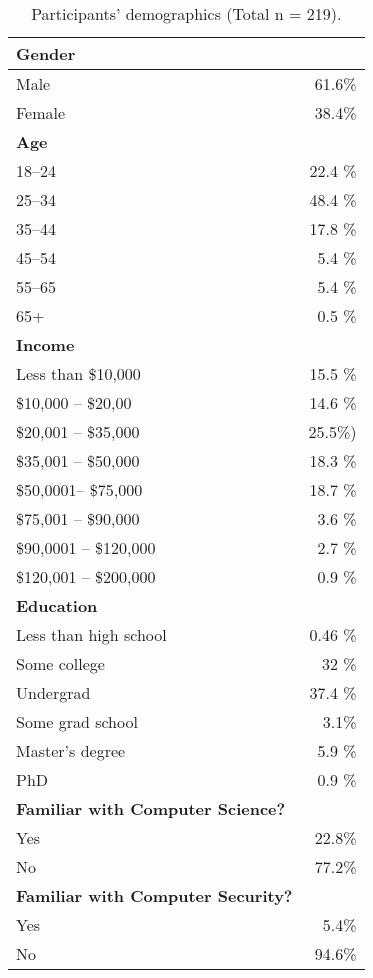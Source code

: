 \documentclass[conference]{IEEEtran}
\begin{document}
\begin{table}[ttt]
\centering
\begin{tabular}{|l r|}
\hline
\textbf{Gender} & \\
\hline
Male & 61.6\% \\
Female & 38.4\% \\
\hline \hline
\textbf{Age}& \\
\hline
18--24 & 22.4 \%\\
25--34 & 48.4 \%\\
35--44 & 17.8 \%\\
45--54 & 5.4 \%\\
55--65 & 5.4 \%\\
65+ & 0.5 \%\\
\hline \hline
\textbf{Income}& \\
\hline
Less than \$10,000 & 15.5 \%\\
\$10,000 -- \$20,00 & 14.6 \%\\
\$20,001 -- \$35,000 & 25.5\%) \\
\$35,001 -- \$50,000 & 18.3 \%\\
\$50,0001-- \$75,000 & 18.7 \%\\
\$75,001 -- \$90,000 & 3.6 \%\\
\$90,0001 -- \$120,000 & 2.7 \%\\
\$120,001 -- \$200,000 & 0.9 \%\\
\hline \hline
\textbf{Education}& \\
\hline
Less than high school & 0.46 \%\\
Some college & 32 \%\\
Undergrad & 37.4 \%\\
Some grad school & 3.1\% \\
Master's degree & 5.9 \%\\
PhD & 0.9 \%\\
\hline \hline
\textbf{Familiar with Computer Science?} & \\
\hline
Yes & 22.8\%\\
No & 77.2\%\\
\hline
\hline
\textbf{Familiar with Computer Security?}& \\
\hline
Yes & 5.4\%\\
No & 94.6\%\\
\hline
\end{tabular}
\vspace{0.2cm}
\caption{Participants' demographics (Total n = 219).\label{demo}}
\vspace{0.1cm}
\end{table}
\end{document}
